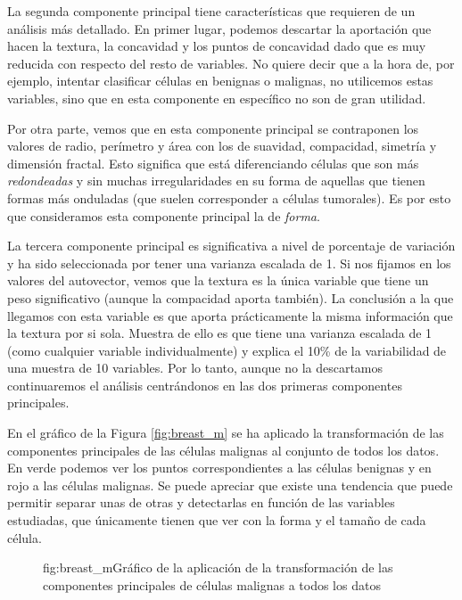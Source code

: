 \documentclass[tfg,cienciasbased,lot,lof,covers,final,overleaf,nocopyright]{tfgtfmthesisuam}
\begin{document}
La segunda componente principal tiene características que requieren de un análisis más detallado. En primer lugar, podemos descartar la aportación que hacen la textura, la concavidad y los puntos de concavidad dado que es muy reducida con respecto del resto de variables. No quiere decir que a la hora de, por ejemplo, intentar clasificar células en benignas o malignas, no utilicemos estas variables, sino que en esta componente en específico no son de gran utilidad.

Por otra parte, vemos que en esta componente principal se contraponen los valores de radio, perímetro y área con los de suavidad, compacidad, simetría y dimensión fractal. Esto significa que está diferenciando células que son más \textit{redondeadas} y sin muchas irregularidades en su forma de aquellas que tienen formas más onduladas (que suelen corresponder a células tumorales). Es por esto que consideramos esta componente principal la de \textit{forma}.

La tercera componente principal es significativa a nivel de porcentaje de variación y ha sido seleccionada por tener una varianza escalada de 1. Si nos fijamos en los valores del autovector, vemos que la textura es la única variable que tiene un peso significativo (aunque la compacidad aporta también). La conclusión a la que llegamos con esta variable es que aporta prácticamente la misma información que la textura por si sola. Muestra de ello es que tiene una varianza escalada de 1 (como cualquier variable individualmente) y explica el 10\% de la variabilidad de una muestra de 10 variables. Por lo tanto, aunque no la descartamos continuaremos el análisis centrándonos en las dos primeras componentes principales.

En el gráfico de la Figura \ref{fig:breast_m} se ha aplicado la transformación de las componentes principales de las células malignas al conjunto de todos los datos. En verde podemos ver los puntos correspondientes a las células benignas y en rojo a las células malignas. Se puede apreciar que existe una tendencia que puede permitir separar unas de otras y detectarlas en función de las variables estudiadas, que únicamente tienen que ver con la forma y el tamaño de cada célula.

\begin{figure}[Gráfico de la aplicación de la transformación de las componentes principales de células malignas a todos los datos]{fig:breast_m}{Gráfico de la aplicación de la transformación de las componentes principales de células malignas a todos los datos}
\end{figure}
\end{document}
